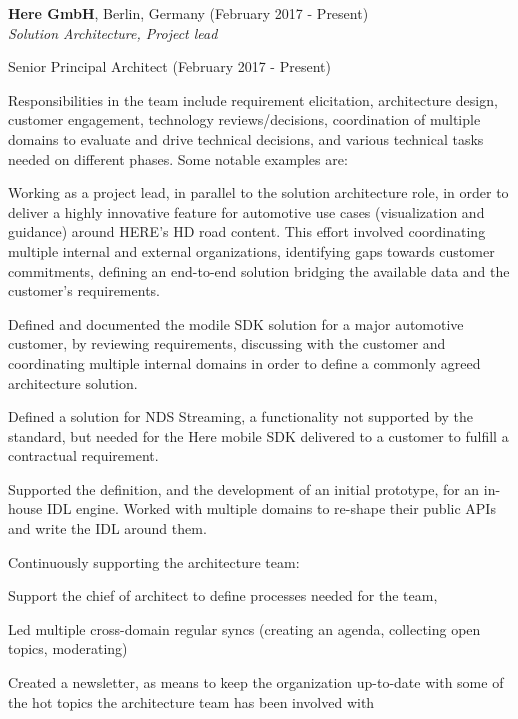 \documentclass[alan.tex]{subfiles}
\begin{document}
  \item \textbf{Here GmbH}, Berlin, Germany (February 2017 - Present)\\
    \emph{Solution Architecture, Project lead}
    \begin{my_desc}
      \item[Senior Principal Architect] (February 2017 - Present)
        \begin{my_bullets}
        \item Responsibilities in the team include requirement elicitation, architecture design,
          customer engagement, technology reviews/decisions, coordination of multiple domains to
          evaluate and drive technical decisions, and various technical tasks needed on different
          phases. Some notable examples are:
            \begin{my_bullets}
            \item Working as a project lead, in parallel to the solution architecture role, in order to
              deliver a highly innovative feature for automotive use cases (visualization and guidance) around
              HERE's HD road content. This effort involved coordinating multiple internal and external
              organizations, identifying gaps towards customer commitments, defining an end-to-end
              solution bridging the available data and the customer's requirements.
            \item Defined and documented the modile SDK solution for a major automotive customer, by reviewing
              requirements, discussing with the customer and coordinating multiple internal domains in order
              to define a commonly agreed architecture solution.
            \item Defined a solution for NDS Streaming, a functionality not supported by the standard, but
              needed for the Here mobile SDK delivered to a customer to fulfill a contractual requirement.
            \item Supported the definition, and the development of an initial prototype, for an in-house
              IDL engine. Worked with multiple domains to re-shape their public APIs and write the IDL around
              them.
            \item Continuously supporting the architecture team:
              \begin{my_bullets}
              \item Support the chief of architect to define processes needed for the team,
              \item Led multiple cross-domain regular syncs (creating an agenda, collecting open topics,
                moderating)
              \item Created a newsletter, as means to keep the organization up-to-date with some of the hot
                topics the architecture team has been involved with
              \end{my_bullets}
            \end{my_bullets}
        \end{my_bullets}
    \end{my_desc}
\end{document}
